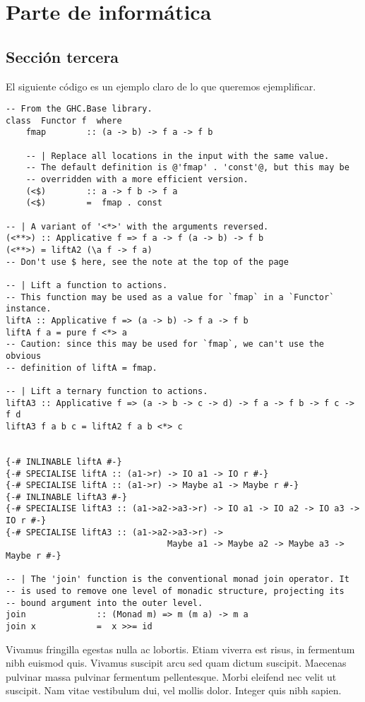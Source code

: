 \documentclass[oneside,openright,titlepage,numbers=noenddot,openany,headinclude,footinclude=true,cleardoublepage=empty,abstractoff,BCOR=5mm,paper=a4,fontsize=12pt,ngerman,spanish,american]{scrreprt}
\begin{document}

\part{Parte de informática}
\chapter{Sección tercera}
El siguiente código es un ejemplo claro de lo que queremos
ejemplificar.

\begin{verbatim}
-- From the GHC.Base library.
class  Functor f  where
    fmap        :: (a -> b) -> f a -> f b

    -- | Replace all locations in the input with the same value.
    -- The default definition is @'fmap' . 'const'@, but this may be
    -- overridden with a more efficient version.
    (<$)        :: a -> f b -> f a
    (<$)        =  fmap . const

-- | A variant of '<*>' with the arguments reversed.
(<**>) :: Applicative f => f a -> f (a -> b) -> f b
(<**>) = liftA2 (\a f -> f a)
-- Don't use $ here, see the note at the top of the page

-- | Lift a function to actions.
-- This function may be used as a value for `fmap` in a `Functor` instance.
liftA :: Applicative f => (a -> b) -> f a -> f b
liftA f a = pure f <*> a
-- Caution: since this may be used for `fmap`, we can't use the obvious
-- definition of liftA = fmap.

-- | Lift a ternary function to actions.
liftA3 :: Applicative f => (a -> b -> c -> d) -> f a -> f b -> f c -> f d
liftA3 f a b c = liftA2 f a b <*> c


{-# INLINABLE liftA #-}
{-# SPECIALISE liftA :: (a1->r) -> IO a1 -> IO r #-}
{-# SPECIALISE liftA :: (a1->r) -> Maybe a1 -> Maybe r #-}
{-# INLINABLE liftA3 #-}
{-# SPECIALISE liftA3 :: (a1->a2->a3->r) -> IO a1 -> IO a2 -> IO a3 -> IO r #-}
{-# SPECIALISE liftA3 :: (a1->a2->a3->r) ->
                                Maybe a1 -> Maybe a2 -> Maybe a3 -> Maybe r #-}

-- | The 'join' function is the conventional monad join operator. It
-- is used to remove one level of monadic structure, projecting its
-- bound argument into the outer level.
join              :: (Monad m) => m (m a) -> m a
join x            =  x >>= id
\end{verbatim}

Vivamus fringilla egestas nulla ac lobortis. Etiam viverra est risus,
in fermentum nibh euismod quis. Vivamus suscipit arcu sed quam dictum
suscipit. Maecenas pulvinar massa pulvinar fermentum
pellentesque. Morbi eleifend nec velit ut suscipit. Nam vitae
vestibulum dui, vel mollis dolor. Integer quis nibh sapien.
\end{document}
